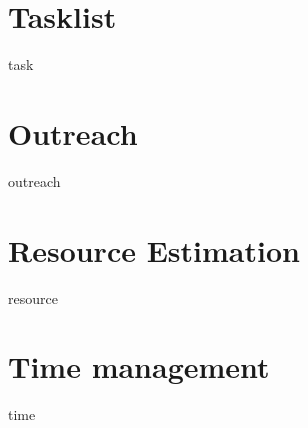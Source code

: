 \documentclass[class=report, crop=false]{standalone}
\begin{document}
\section{Tasklist}
{task}
\section{Outreach}
{outreach}
\section{Resource Estimation}
{resource}
\section{Time management}
{time}
\end{document}
